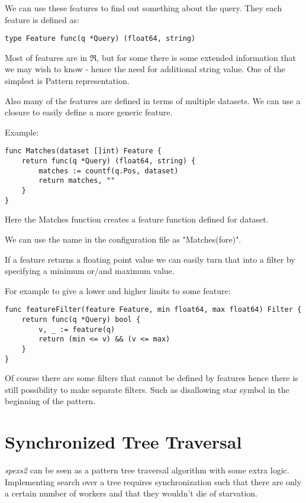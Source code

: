 We can use these features to find out something about the query. They each feature is defined as:

\begin{verbatim}
type Feature func(q *Query) (float64, string)
\end{verbatim}

Most of features are in $\Re$, but for some there is some extended information that we may wish to know - hence the need for additional string value. One of the simplest is Pattern representation.

Also many of the features are defined in terms of multiple datasets. We can use a closure to easily define a more generic feature.

Example:

\begin{verbatim}
func Matches(dataset []int) Feature {
    return func(q *Query) (float64, string) {
        matches := countf(q.Pos, dataset)
        return matches, ""
    }
}
\end{verbatim}

Here the Matches function creates a feature function defined for dataset.

We can use the name in the configuration file as "Matches(fore)".

If a feature returns a floating point value we can easily turn that into a filter by specifying a minimum or/and maximum value.

For example to give a lower and higher limits to some feature:

\begin{verbatim}
func featureFilter(feature Feature, min float64, max float64) Filter {
    return func(q *Query) bool {
        v, _ := feature(q)
        return (min <= v) && (v <= max)
    }
}
\end{verbatim}

Of course there are some filters that cannot be defined by features hence there is still possibility to make separate filters. Such as disallowing star symbol in the beginning of the pattern.

\section{Synchronized Tree Traversal}

\emph{spexs2} can be seen as a pattern tree traversal algorithm with some extra logic. Implementing search over a tree requires synchronization such that there are only a certain number of workers and that they wouldn't die of starvation.

